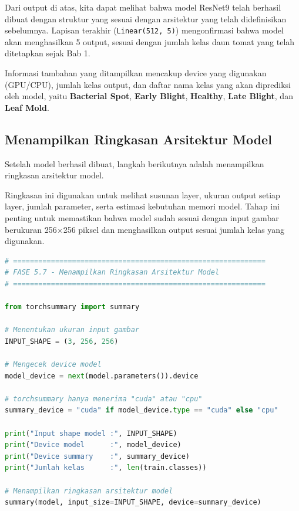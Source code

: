 Dari output di atas, kita dapat melihat bahwa model ResNet9 telah berhasil dibuat dengan struktur yang sesuai dengan arsitektur yang telah didefinisikan sebelumnya. Lapisan terakhir (\texttt{Linear(512, 5)}) mengonfirmasi bahwa model akan menghasilkan 5 output, sesuai dengan jumlah kelas daun tomat yang telah ditetapkan sejak Bab 1.

Informasi tambahan yang ditampilkan mencakup device yang digunakan (GPU/CPU), jumlah kelas output, dan daftar nama kelas yang akan diprediksi oleh model, yaitu \textbf{Bacterial Spot}, \textbf{Early Blight}, \textbf{Healthy}, \textbf{Late Blight}, dan \textbf{Leaf Mold}.

\subsection{Menampilkan Ringkasan Arsitektur Model}

Setelah model berhasil dibuat, langkah berikutnya adalah menampilkan ringkasan arsitektur model.

Ringkasan ini digunakan untuk melihat susunan layer, ukuran output setiap layer, jumlah parameter, serta estimasi kebutuhan memori model. Tahap ini penting untuk memastikan bahwa model sudah sesuai dengan input gambar berukuran 256×256 piksel dan menghasilkan output sesuai jumlah kelas yang digunakan.

\begin{lstlisting}[language=Python, caption=Menampilkan ringkasan arsitektur model]
# ============================================================
# FASE 5.7 - Menampilkan Ringkasan Arsitektur Model
# ============================================================

from torchsummary import summary

# Menentukan ukuran input gambar
INPUT_SHAPE = (3, 256, 256)

# Mengecek device model
model_device = next(model.parameters()).device

# torchsummary hanya menerima "cuda" atau "cpu"
summary_device = "cuda" if model_device.type == "cuda" else "cpu"

print("Input shape model :", INPUT_SHAPE)
print("Device model      :", model_device)
print("Device summary    :", summary_device)
print("Jumlah kelas      :", len(train.classes))

# Menampilkan ringkasan arsitektur model
summary(model, input_size=INPUT_SHAPE, device=summary_device)
\end{lstlisting}

